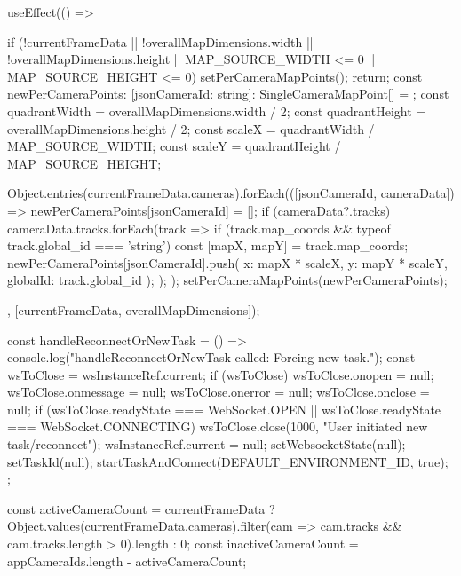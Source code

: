 {  useEffect(() => {
    if (!currentFrameData || !overallMapDimensions.width || !overallMapDimensions.height || MAP_SOURCE_WIDTH <= 0 || MAP_SOURCE_HEIGHT <= 0) {
      setPerCameraMapPoints({}); return;
    }
    const newPerCameraPoints: { [jsonCameraId: string]: SingleCameraMapPoint[] } = {};
    const quadrantWidth = overallMapDimensions.width / 2;
    const quadrantHeight = overallMapDimensions.height / 2;
    const scaleX = quadrantWidth / MAP_SOURCE_WIDTH;
    const scaleY = quadrantHeight / MAP_SOURCE_HEIGHT;

    Object.entries(currentFrameData.cameras).forEach(([jsonCameraId, cameraData]) => {
      newPerCameraPoints[jsonCameraId] = [];
      if (cameraData?.tracks) {
        cameraData.tracks.forEach(track => {
          if (track.map_coords && typeof track.global_id === 'string') {
            const [mapX, mapY] = track.map_coords;
            newPerCameraPoints[jsonCameraId].push({
              x: mapX * scaleX, y: mapY * scaleY, globalId: track.global_id
            });
          }
        });
      }
    });
    setPerCameraMapPoints(newPerCameraPoints);
  }, [currentFrameData, overallMapDimensions]);

  const handleReconnectOrNewTask = () => {
    console.log("handleReconnectOrNewTask called: Forcing new task.");
    const wsToClose = wsInstanceRef.current;
    if (wsToClose) {
        wsToClose.onopen = null; wsToClose.onmessage = null;
        wsToClose.onerror = null; wsToClose.onclose = null;
        if (wsToClose.readyState === WebSocket.OPEN || wsToClose.readyState === WebSocket.CONNECTING) {
            wsToClose.close(1000, "User initiated new task/reconnect");
        }
        wsInstanceRef.current = null;
    }
    setWebsocketState(null);
    setTaskId(null); 
    startTaskAndConnect(DEFAULT_ENVIRONMENT_ID, true);
  };

  const activeCameraCount = currentFrameData ? Object.values(currentFrameData.cameras).filter(cam => cam.tracks && cam.tracks.length > 0).length : 0;
  const inactiveCameraCount = appCameraIds.length - activeCameraCount;

}
